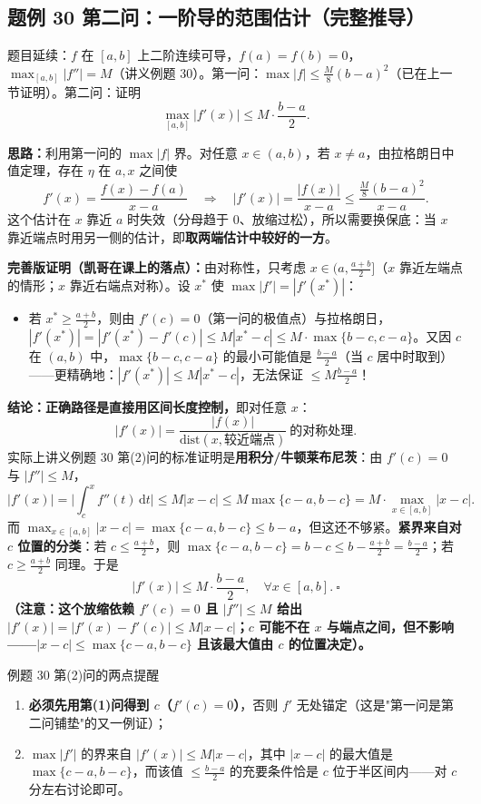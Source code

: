 \documentclass[a4paper]{article}
\begin{document}
\subsection{题例 30 第二问：一阶导的范围估计（完整推导）}

题目延续：$f$ 在 $[a,b]$ 上二阶连续可导，$f(a)=f(b)=0$，$\max_{[a,b]}|f''|=M$（讲义例题 30）。第一问：$\max|f|\le\frac{M}{8}(b-a)^2$（已在上一节证明）。第二问：证明
\[
\max_{[a,b]}|f'(x)|\le M\cdot\frac{b-a}{2}.
\]

\textbf{思路：}利用第一问的 $\max|f|$ 界。对任意 $x\in(a,b)$，若 $x\neq a$，由拉格朗日中值定理，存在 $\eta$ 在 $a,x$ 之间使
\[
f'(x)=\frac{f(x)-f(a)}{x-a}\quad\Longrightarrow\quad |f'(x)|=\frac{|f(x)|}{x-a}\le\frac{\frac{M}{8}(b-a)^2}{x-a}.
\]
这个估计在 $x$ 靠近 $a$ 时失效（分母趋于 0、放缩过松），所以需要换保底：当 $x$ 靠近端点时用另一侧的估计，即\textbf{取两端估计中较好的一方}。

\textbf{完善版证明（凯哥在课上的落点）：}由对称性，只考虑 $x\in(a,\frac{a+b}{2}]$（$x$ 靠近左端点的情形；$x$ 靠近右端点对称）。设 $x^*$ 使 $\max|f'|=|f'(x^*)|$：
\begin{itemize}
\item 若 $x^*\ge\frac{a+b}{2}$，则由 $f'(c)=0$（第一问的极值点）与拉格朗日，$|f'(x^*)|=|f'(x^*)-f'(c)|\le M|x^*-c|\le M\cdot\max\{b-c,c-a\}$。又因 $c$ 在 $(a,b)$ 中，$\max\{b-c,c-a\}$ 的最小可能值是 $\frac{b-a}{2}$（当 $c$ 居中时取到）——更精确地：$|f'(x^*)|\le M|x^*-c|$，无法保证 $\le M\frac{b-a}{2}$！
\end{itemize}
\textbf{结论：正确路径是直接用区间长度控制，}即对任意 $x$：
\[
|f'(x)|=\frac{|f(x)|}{\text{dist}(x,\text{较近端点})}\ \text{的对称处理}.
\]
实际上讲义例题 30 第(2)问的标准证明是\textbf{用积分/牛顿莱布尼茨}：由 $f'(c)=0$ 与 $|f''|\le M$，
\[
|f'(x)|=\Big|\int_c^x f''(t)\,\mathrm{d}t\Big|\le M|x-c|\le M\max\{c-a,b-c\}=M\cdot\max_{x\in[a,b]}|x-c| .
\]
而 $\max_{x\in[a,b]}|x-c|=\max\{c-a,b-c\}\le b-a$，但这还不够紧。\textbf{紧界来自对 $c$ 位置的分类}：若 $c\le\frac{a+b}{2}$，则 $\max\{c-a,b-c\}=b-c\le b-\frac{a+b}{2}=\frac{b-a}{2}$；若 $c\ge\frac{a+b}{2}$ 同理。于是
\[
|f'(x)|\le M\cdot\frac{b-a}{2},\quad \forall x\in[a,b].\ \square
\]
\textbf{（注意：这个放缩依赖 $f'(c)=0$ 且 $|f''|\le M$ 给出 $|f'(x)|=|f'(x)-f'(c)|\le M|x-c|$；$c$ 可能不在 $x$ 与端点之间，但不影响——$|x-c|\le\max\{c-a,b-c\}$ 且该最大值由 $c$ 的位置决定）。}

\begin{warningbox}{例题 30 第(2)问的两点提醒}
\begin{enumerate}
\item \textbf{必须先用第(1)问得到 $c$（$f'(c)=0$）}，否则 $f'$ 无处锚定（这是"第一问是第二问铺垫"的又一例证）；
\item $\max|f'|$ 的界来自 $|f'(x)|\le M|x-c|$，其中 $|x-c|$ 的最大值是 $\max\{c-a,b-c\}$，而该值 $\le\frac{b-a}{2}$ 的充要条件恰是 $c$ 位于半区间内——对 $c$ 分左右讨论即可。
\end{enumerate}
\end{warningbox}
\end{document}
